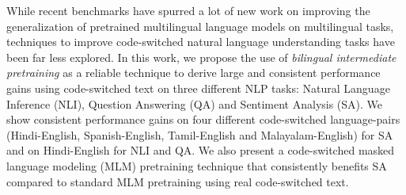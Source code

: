 While recent benchmarks have spurred a lot of new work on improving the generalization of pretrained multilingual language models on multilingual tasks, techniques to improve code-switched natural language understanding tasks have been far less explored. In this work, we propose the use of \emph{bilingual intermediate pretraining} as a reliable technique to derive large and consistent performance gains using code-switched text on three different NLP tasks: Natural Language Inference (NLI), Question Answering (QA) and Sentiment Analysis (SA). We show consistent performance gains on four different code-switched language-pairs (Hindi-English, Spanish-English, Tamil-English and Malayalam-English) for SA and on Hindi-English for NLI and QA. We also present a code-switched masked language modeling (MLM) pretraining technique that consistently benefits SA compared to standard MLM pretraining using real code-switched text.

